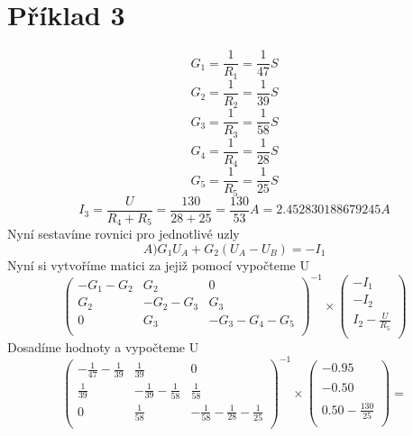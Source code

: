\section{Příklad 3}
\[
  G_1 = \displaystyle\frac{1}{R_1}
  = \displaystyle\frac{1}{47}S
\]
\[
  G_2 = \displaystyle\frac{1}{R_2}
  = \displaystyle\frac{1}{39}S
\]
\[
  G_3 = \displaystyle\frac{1}{R_3}
  = \displaystyle\frac{1}{58}S
\]
\[
  G_4 = \displaystyle\frac{1}{R_4}
  = \displaystyle\frac{1}{28}S
\]
\[
  G_5 = \displaystyle\frac{1}{R_5}
  = \displaystyle\frac{1}{25}S
\]
\[
  I_3 = \displaystyle\frac{U}{R_4 + R_5}
  = \displaystyle\frac{130}{28 + 25}
  = \displaystyle\frac{130}{53}A
  = 2.452830188679245A
\]
 Nyní sestavíme rovnici pro jednotlivé uzly
 \[
   A)G_1 U_A + G_2 (U_A - U_B ) = -I_1
 \]
 Nyní si vytvoříme matici za jejiž pomocí vypočteme U
\[
  \begin{pmatrix}
    -G_1-G_2 & G_2 & 0\\
    G_2 & -G_2-G_3 & G_3\\
    0 & G_3 & -G_3-G_4-G_5\\
  \end{pmatrix}^{-1}
  \times
  \begin{pmatrix}
    -I_1\\
    -I_2\\
    I_2-\displaystyle\frac{U}{R_5}\\
  \end{pmatrix}
\]
Dosadíme hodnoty a vypočteme U\\
\[
  \begin{pmatrix}
    -\displaystyle\frac{1}{47} -\displaystyle\frac{1}{39} & \displaystyle\frac{1}{39} & 0\\
    \displaystyle\frac{1}{39} & -\displaystyle\frac{1}{39}-\displaystyle\frac{1}{58} & \displaystyle\frac{1}{58}\\
    0 & \displaystyle\frac{1}{58} & -\displaystyle\frac{1}{58}-\displaystyle\frac{1}{28}-\displaystyle\frac{1}{25}\\
  \end{pmatrix}^{-1}
  \times
  \begin{pmatrix}
    -0.95\\
    \\
    -0.50\\
    \\
    0.50-\displaystyle\frac{130}{25}\\
    
  \end{pmatrix}
  =
\]
